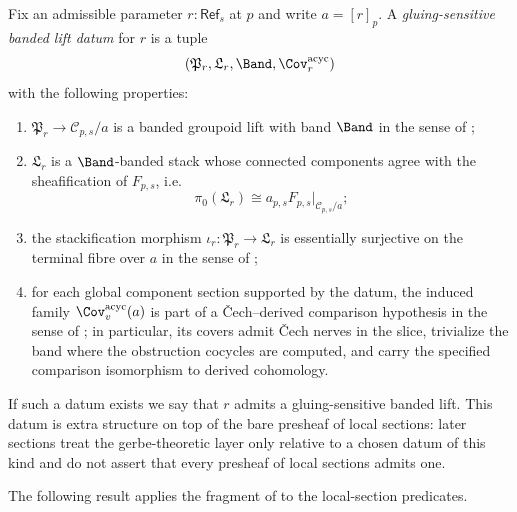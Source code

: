 \begin{definition}\label{def:gluing-sensitive-banded-lift}
Fix an admissible parameter $r:\mathsf{Ref}_s$ at $p$ and write $a=[r]_p$. A \emph{gluing-sensitive banded lift datum} for $r$ is a tuple
\[
(\mathfrak P_r,\mathfrak L_r,\Band,\Cov_r^{\mathrm{acyc}})
\]
with the following properties:
\begin{enumerate}[label=(\roman*),nosep]
\item $\mathfrak P_r\to\mathcal C_{p,s}/a$ is a banded groupoid lift with band $\Band$ in the sense of ;
\item $\mathfrak L_r$ is a $\Band$-banded stack whose connected components agree with the sheafification of $F_{p,s}$, i.e.
\[
\pi_0(\mathfrak L_r)\cong a_{p,s}F_{p,s}|_{\mathcal C_{p,s}/a};
\]
\item the stackification morphism $\iota_r:\mathfrak P_r\to\mathfrak L_r$ is essentially surjective on the terminal fibre over $a$ in the sense of ;
\item for each global component section supported by the datum, the induced family
\(\Cov_v^{\mathrm{acyc}}(a)\) is part of a \v{C}ech--derived comparison
hypothesis in the sense of
; in
particular, its covers admit \v{C}ech nerves in the slice, trivialize the
band where the obstruction cocycles are computed, and carry the specified
comparison isomorphism to derived cohomology.
\end{enumerate}
If such a datum exists we say that $r$ admits a gluing-sensitive banded lift. This datum is extra structure on top of the bare presheaf of local sections: later sections treat the gerbe-theoretic layer only relative to a chosen datum of this kind and do not assert that every presheaf of local sections admits one.
\end{definition}

The following result applies the fragment of  to the local-section predicates.


